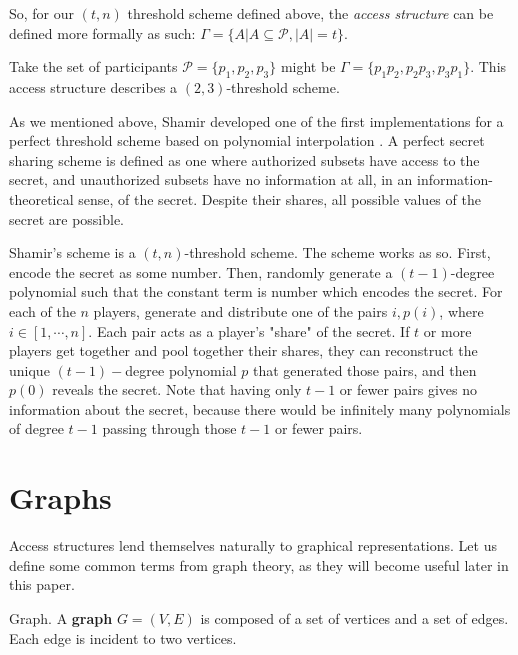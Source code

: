 So, for our $(t,n)$ threshold scheme defined above, the \textit{access structure} can be defined more formally as such: $\Gamma = \{A | A \subseteq \mathcal{P} , |A| = t\}$.

\begin{example}
    Take the set of participants $\mathcal{P} = \{p_1,p_2,p_3\}$ might be $\Gamma = \{p_1p_2,p_2p_3,p_3p_1\}$. This access structure describes a $(2,3)$-threshold scheme.
\end{example}

As we mentioned above, Shamir developed one of the first implementations for a perfect threshold scheme based on polynomial interpolation \cite{shamir}. A perfect secret sharing scheme is defined as one where authorized subsets have access to the secret, and unauthorized subsets have no information at all, in an information-theoretical sense, of the secret. Despite their shares, all possible values of the secret are possible.

Shamir's scheme is a $(t,n)$-threshold scheme. The scheme works as so. First, encode the secret as some number. Then, randomly generate a $(t-1)$-degree polynomial such that the constant term is number which encodes the secret. For each of the $n$ players, generate and distribute one of the pairs $i, p(i)$, where $i \in [1, \cdots, n]$. Each pair acts as a player's "share" of the secret. If $t$ or more players get together and pool together their shares, they can reconstruct the unique $(t-1)-$degree polynomial $p$ that generated those pairs, and then $p(0)$ reveals the secret. Note that having only $t-1$ or fewer pairs gives no information about the secret, because there would be infinitely many polynomials of degree $t-1$ passing through those $t-1$ or fewer pairs.

\section{Graphs}
\label{sec:graphs}

Access structures lend themselves naturally to graphical representations. Let us define some common terms from graph theory, as they will become useful later in this paper. 

\begin{definition}{Graph.}
    \label{defn:graph}
    A \textbf{graph} $G=(V,E)$ is composed of a set of vertices and a set of edges. Each edge is incident to two vertices.
\end{definition}



